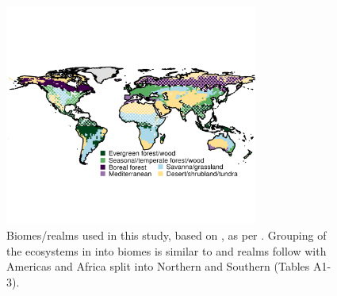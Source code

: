 \documentclass[bg, manuscript]{copernicus}
\begin{document}
\noappendix       %




\appendixfigures  %
\begin{figure}[t]
\includegraphics[width=8.3cm]{figs/biomeMap.png}
\caption{Biomes/realms used in this study, based on \citet{Olson2001-gv}, as per \citet{Sellar2019-bo}. Grouping of the ecosystems in\citet{Olson2001-gv} into biomes is similar to \citet{Kelley2019-yu} and realms follow \citet{Olson2001-gv} with Americas and Africa split into Northern and Southern (Tables A1-3).
 \label{fig:regionsMap}}
\end{figure}
\end{document}
